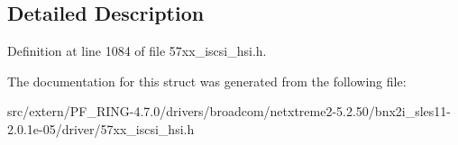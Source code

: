 \subsection{Detailed Description}


Definition at line 1084 of file 57xx\_\-iscsi\_\-hsi.h.



The documentation for this struct was generated from the following file:\begin{DoxyCompactItemize}
\item 
src/extern/PF\_\-RING-\/4.7.0/drivers/broadcom/netxtreme2-\/5.2.50/bnx2i\_\-sles11-\/2.0.1e-\/05/driver/57xx\_\-iscsi\_\-hsi.h\end{DoxyCompactItemize}
